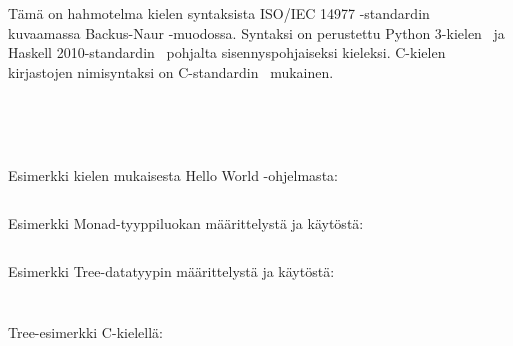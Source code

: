 
Tämä on hahmotelma kielen syntaksista ISO/IEC 14977
-standardin~\citep{iso14977} kuvaamassa Backus-Naur -muodossa. Syntaksi on
perustettu Python 3-kielen~\citep{pythonsyntax} ja Haskell
2010-standardin~\citep{haskellsyntax} pohjalta sisennyspohjaiseksi kieleksi.
C-kielen kirjastojen nimisyntaksi on C-standardin~\citep{C11} mukainen.


\inputminted{abnf}{kieli-base.bnf}
\inputminted{abnf}{kieli-imports.bnf}
\newpage
\inputminted{abnf}{kieli-types.bnf}
\inputminted{abnf}{kieli-data.bnf}
\newpage
\inputminted{abnf}{kieli-body.bnf}
\newpage

Esimerkki kielen mukaisesta Hello World -ohjelmasta:

\def\mylexer{kieli_lexer.py:KieliLexer -x}
\inputminted{\mylexer}{example.kieli}

Esimerkki Monad-tyyppiluokan määrittelystä ja käytöstä:

\inputminted{\mylexer}{monad.kieli}

\newpage

Esimerkki Tree-datatyypin määrittelystä ja käytöstä:

\inputminted{\mylexer}{tree.kieli}
\inputminted{text}{tree-output}
\newpage

Tree-esimerkki C-kielellä:

\inputminted{C}{tree.c}
